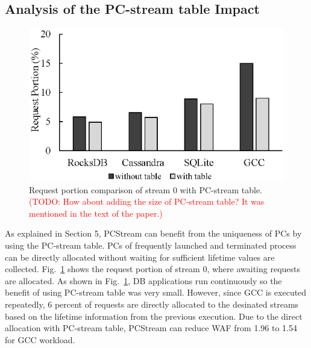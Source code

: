 \subsection{Analysis of the PC-stream table Impact}

\begin{figure}[t]
	\centering
	\includegraphics[width=0.7\linewidth]{figure/pctable}
	\caption{Request portion comparison of stream 0 with PC-stream table.
		\textcolor{red}{(TODO: How about adding the size of PC-stream table? It was mentioned in
		the text of the paper.)} }
	\label{fig:pctable}
\end{figure}

As explained in Section 5, PCStream can benefit from the uniqueness of PCs
by using the PC-stream table.
PCs of frequently launched and terminated process can be directly allocated without
waiting for sufficient lifetime values are collected.
Fig.~\ref{fig:pctable} shows the request portion of stream 0, where 
awaiting requests are allocated.
As shown in Fig.~\ref{fig:pctable}, DB applications run 
continuously so the benefit of using PC-stream table was very small. 
However, since GCC is executed repeatedly, 6 percent of requests are directly
allocated to the desinated streams based on the lifetime information from the 
previous execution. 
Due to the direct allocation with PC-stream table, PCStream can 
reduce WAF from 1.96 to 1.54 for GCC workload.


